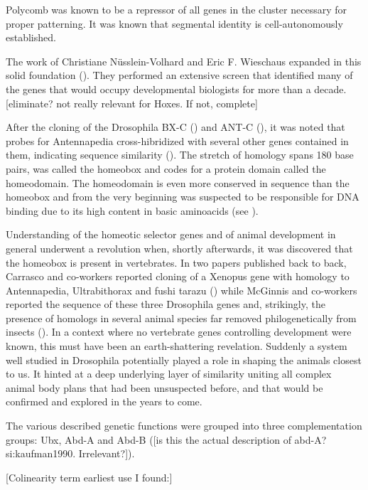 Polycomb was known to be a repressor of all genes in the cluster necessary for proper patterning. It was known that segmental identity is cell-autonomously established. 

The work of Christiane Nüsslein-Volhard and Eric F. Wieschaus expanded in this solid foundation (\cite{Nuesslein-Volhard1980}). They performed an extensive screen that identified many of the genes that would occupy developmental biologists for more than a decade. [eliminate? not really relevant for Hoxes. If not, complete]

After the cloning of the Drosophila \ac{BX-C} (\cite{Bender1983}) and \ac{ANT-C} (\cite{Garber1983,Scott1983}), it was noted that probes for Antennapedia cross-hibridized with several other genes contained in them, indicating sequence similarity (\cite{McGinnis1984}).  The stretch of homology spans 180 base pairs, was called the homeobox and codes for a protein domain called the homeodomain. The homeodomain is even more conserved in sequence than the homeobox and from the very beginning was suspected to be responsible for DNA binding due to its high content in basic aminoacids (see \cite{Gehring1985}).

Understanding of the homeotic selector genes and of animal development in general underwent a revolution when, shortly afterwards, it was discovered that the homeobox is present in vertebrates. In two papers published back to back, Carrasco and co-workers reported cloning of a Xenopus gene with homology to Antennapedia, Ultrabithorax and fushi tarazu (\cite{Carrasco1984}) while McGinnis and co-workers reported the sequence of these three Drosophila genes and, strikingly, the presence of homologs in several animal species far removed philogenetically from insects (\cite{McGinnis1984b}). In a context where no vertebrate genes controlling development were known, this must have been an earth-shattering revelation. Suddenly a system well studied in Drosophila potentially played a role in shaping the animals closest to us. It hinted at a deep underlying layer of similarity uniting all complex animal body plans that had been unsuspected before, and that would be confirmed and explored in the years to come.

The various described genetic functions were grouped into three complementation groups: Ubx, Abd-A and Abd-B (\cite{Sanchez-Herrero1985}[is this the actual description of abd-A?si:kaufman1990. Irrelevant?]).

[Colinearity term earliest use I found:\cite{Lewis1985}]

